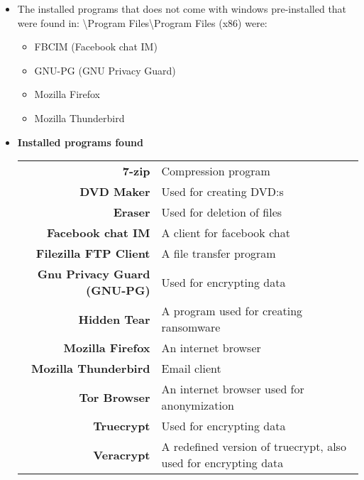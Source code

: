 \begin{enumerate}
\begin{itemize}
	\item The installed programs that does not come with windows pre-installed that were found in:
	\textbackslash Program Files\textbackslash Program Files (x86) were:
	
	\begin{itemize}
		\item FBCIM (Facebook chat IM) 
		\item GNU-PG (GNU Privacy Guard) 
		\item Mozilla Firefox
		\item Mozilla Thunderbird
	\end{itemize}
	
	\newpage
	\item \textbf{Installed programs found}
	
	\begin{tabular}{|r|l|}
		\hline
		\textbf{7-zip} & Compression program \\
		\textbf{DVD Maker} & Used for creating DVD:s \\
		\textbf{Eraser} & Used for deletion of files \\
		\textbf{Facebook chat IM} & A client for facebook chat \\
		\textbf{Filezilla FTP Client} & A file transfer program \\
		\textbf{Gnu Privacy Guard (GNU-PG)} & Used for encrypting data \\
		\textbf{Hidden Tear} & A program used for creating ransomware \\
		\textbf{Mozilla Firefox} & An internet browser \\
		\textbf{Mozilla Thunderbird} & Email client \\
		\textbf{Tor Browser} & An internet browser used for anonymization \\
		\textbf{Truecrypt} & Used for encrypting data \\
		\textbf{Veracrypt} & A redefined version of truecrypt, also used for encrypting data \\
		\hline
	\end{tabular}
	

\end{itemize}
\end{enumerate}
